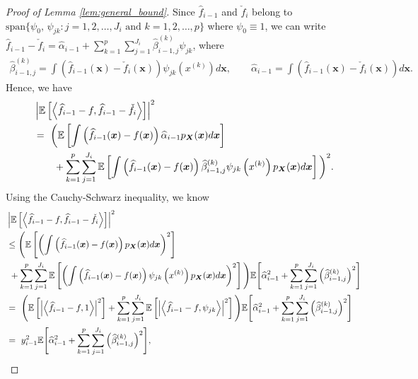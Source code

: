 \begin{proof}[Proof of Lemma \ref{lem:general_bound}]
Since $ \hat{f}_{i-1} $ and $ \check f_i $ belong to $\text{span}\{\psi_0,\,\psi_{jk}: j=1,2,\dots,J_i \text{ and } k = 1,2,\dots,p\}  $ where $\psi_0 \equiv 1$, we can write $ \hat{f}_{i-1}-\check f_i = \hat\alpha_{i-1}+\sum_{k=1}^p\sum_{j=1}^{J_i} \hat\beta_{i-1,j}^{(k)}\psi_{jk} $, where 
\begin{align}
\hat\beta_{i-1,j}^{(k)} = \int \left(\hat{f}_{i-1}(\boldsymbol{x})-\check{f}_i(\boldsymbol{x})\right)\psi_{jk}\left(x^{(k)}\right) d\boldsymbol{x}, \qquad \hat\alpha_{i-1} = \int \left(\hat{f}_{i-1}(\boldsymbol{x})-\check{f}_i(\boldsymbol{x})\right) d\boldsymbol{x}.    \label{notation:lem} 
\end{align}
Hence, we have
\begin{align*}
    &\left|\mathbb{E}\left[\left\langle \widehat{f}_{i-1}-f,\widehat{f}_{i-1}-\check f_i \right\rangle\right]\right|^2\notag\\ 
    &=~ \bigg(\mathbb{E}\left[\int \left(\widehat{f}_{i-1}(\boldsymbol{x})-f(\boldsymbol{x})\right)\widehat\alpha_{i-1}p_{\bm{X}}(\boldsymbol{x})d\boldsymbol{x} \right]\notag\\
    &\qquad + \sum_{k=1}^p\sum_{j=1}^{J_i}\mathbb{E}\left[\int \left(\widehat{f}_{i-1}(\boldsymbol{x})-f(\boldsymbol{x})\right)\widehat\beta_{i-1,j}^{(k)}\psi_{jk}\left(x^{(k)}\right)p_{\bm{X}}(\boldsymbol{x})d\boldsymbol{x} \right]
 \bigg)^2.
\end{align*}
Using the  Cauchy-Schwarz inequality, we know 
\begin{align}
    &\left|\mathbb{E}\left[\left\langle \widehat{f}_{i-1}-f,\widehat{f}_{i-1}-\check f_i \right\rangle\right]\right|^2\notag\\ 
 &\leq \Bigg(\mathbb{E}\left[ \left(\int \left(\widehat{f}_{i-1}(\boldsymbol{x})-f(\boldsymbol{x})\right)p_{\bm{X}}(\boldsymbol{x})d\boldsymbol{x}\right)^2 \right]\notag\\
 &~ + \sum_{k=1}^p\sum_{j=1}^{J_i}\mathbb{E}\left[ \left(\int \left(\widehat{f}_{i-1}(\boldsymbol{x})-f(\boldsymbol{x})\right)\psi_{jk}\left(x^{(k)}\right)p_{\bm{X}}(\boldsymbol{x})d\boldsymbol{x}\right)^2 \right]   \Bigg) \mathbb{E}\Bigg[\widehat\alpha_{i-1}^2+ \sum_{k=1}^p\sum_{j=1}^{J_i} \Big(\widehat\beta_{i-1,j}^{(k)}\Big)^2\Bigg] \notag \\
 &=~  \Bigg(\mathbb{E}\left[\left|\left\langle \widehat{f}_{i-1}-f,1 \right\rangle\right|^2\right]+\sum_{k=1}^p\sum_{j=1}^{J_i}\mathbb{E}\left[\left|\left\langle \widehat{f}_{i-1}-f,\psi_{jk} \right\rangle\right|^2\right]\Bigg)  \mathbb{E}\Bigg[\widehat\alpha_{i-1}^2+ \sum_{k=1}^p\sum_{j=1}^{J_i} \Big(\widehat\beta_{i-1,j}^{(k)}\Big)^2\Bigg]\\
 &=~y_{i-1}^2\mathbb{E}\Bigg[\widehat\alpha_{i-1}^2+ \sum_{k=1}^p\sum_{j=1}^{J_i} \Big(\widehat\beta_{i-1,j}^{(k)}\Big)^2\Bigg], \label{ineq:inter2}
\end{align}

\end{proof}
